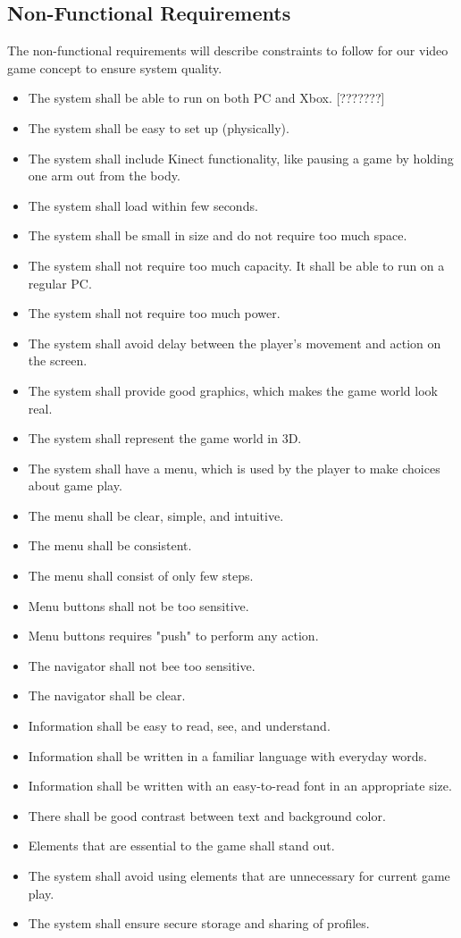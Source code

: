 \subsection{Non-Functional Requirements}
The non-functional requirements will describe constraints to follow for our video game concept to ensure system quality.
\begin{itemize}
\renewcommand{\labelitemi}{$\bullet$}
\item The system shall be able to run on both PC and Xbox. [???????] 
\item The system shall be easy to set up (physically).
\item The system shall include Kinect functionality, like pausing a game by holding one arm out from the body. 
\item The system shall load within few seconds.
\item The system shall be small in size and do not require too much space.
\item The system shall not require too much capacity. It shall be able to run on a regular PC. 
\item The system shall not require too much power. 
\item The system shall avoid delay between the player's movement and action on the screen.
\item The system shall provide good graphics, which makes the game world look real.
\item The system shall represent the game world in 3D.
\item The system shall have a menu, which is used by the player to make choices about game play.
\item The menu shall be clear, simple, and intuitive.
\item The menu shall be consistent. 
\item The menu shall consist of only few steps.
\item Menu buttons shall not be too sensitive. 
\item Menu buttons requires "push" to perform any action.
\item The navigator shall not bee too sensitive.
\item The navigator shall be clear.
\item Information shall be easy to read, see, and understand.
\item Information shall be written in a familiar language with everyday words. 
\item Information shall be written with an easy-to-read font in an appropriate size.
\item There shall be good contrast between text and background color. 
\item Elements that are essential to the game shall stand out.
\item The system shall avoid using elements that are unnecessary for current game play.
\item The system shall ensure secure storage and sharing of profiles. 
\end{itemize}


